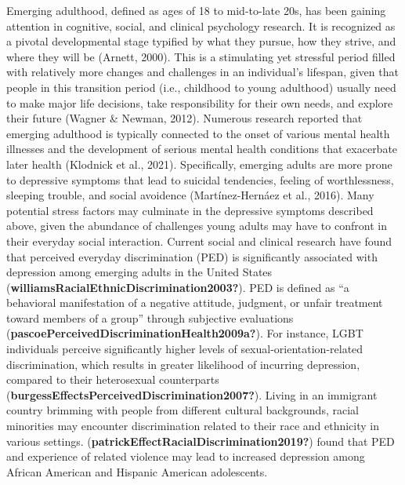 \documentclass[
  man]{apa7}
\begin{document}
Emerging adulthood, defined as ages of 18 to mid-to-late 20s, has been gaining attention in cognitive, social, and clinical psychology research. It is recognized as a pivotal developmental stage typified by what they pursue, how they strive, and where they will be (Arnett, 2000). This is a stimulating yet stressful period filled with relatively more changes and challenges in an individual's lifespan, given that people in this transition period (i.e., childhood to young adulthood) usually need to make major life decisions, take responsibility for their own needs, and explore their future (Wagner \& Newman, 2012). Numerous research reported that emerging adulthood is typically connected to the onset of various mental health illnesses and the development of serious mental health conditions that exacerbate later health (Klodnick et al., 2021). Specifically, emerging adults are more prone to depressive symptoms that lead to suicidal tendencies, feeling of worthlessness, sleeping trouble, and social avoidence (Martínez-Hernáez et al., 2016).
Many potential stress factors may culminate in the depressive symptoms described above, given the abundance of challenges young adults may have to confront in their everyday social interaction. Current social and clinical research have found that perceived everyday discrimination (PED) is significantly associated with depression among emerging adults in the United States (\textbf{williamsRacialEthnicDiscrimination2003?}). PED is defined as ``a behavioral manifestation of a negative attitude, judgment, or unfair treatment toward members of a group'' through subjective evaluations (\textbf{pascoePerceivedDiscriminationHealth2009a?}). For instance, LGBT individuals perceive significantly higher levels of sexual-orientation-related discrimination, which results in greater likelihood of incurring depression, compared to their heterosexual counterparts (\textbf{burgessEffectsPerceivedDiscrimination2007?}). Living in an immigrant country brimming with people from different cultural backgrounds, racial minorities may encounter discrimination related to their race and ethnicity in various settings. (\textbf{patrickEffectRacialDiscrimination2019?}) found that PED and experience of related violence may lead to increased depression among African American and Hispanic American adolescents.
\end{document}
